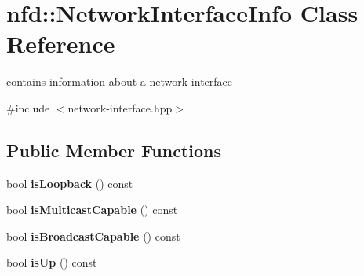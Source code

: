 \hypertarget{classnfd_1_1NetworkInterfaceInfo}{}\section{nfd\+:\+:Network\+Interface\+Info Class Reference}
\label{classnfd_1_1NetworkInterfaceInfo}


contains information about a network interface  




{\ttfamily \#include $<$network-\/interface.\+hpp$>$}

\subsection*{Public Member Functions}
\begin{DoxyCompactItemize}
\item 
bool {\bfseries is\+Loopback} () const\hypertarget{classnfd_1_1NetworkInterfaceInfo_a92528790a8c408245b7bc2b94d77c982}{}\label{classnfd_1_1NetworkInterfaceInfo_a92528790a8c408245b7bc2b94d77c982}

\item 
bool {\bfseries is\+Multicast\+Capable} () const\hypertarget{classnfd_1_1NetworkInterfaceInfo_adb6d6a655e9931b5e5f8f565a3ef85c6}{}\label{classnfd_1_1NetworkInterfaceInfo_adb6d6a655e9931b5e5f8f565a3ef85c6}

\item 
bool {\bfseries is\+Broadcast\+Capable} () const\hypertarget{classnfd_1_1NetworkInterfaceInfo_ac0bbebd2bafc846f324f25c1dc120def}{}\label{classnfd_1_1NetworkInterfaceInfo_ac0bbebd2bafc846f324f25c1dc120def}

\item 
bool {\bfseries is\+Up} () const\hypertarget{classnfd_1_1NetworkInterfaceInfo_a86051d15408383f1448e60860d8bea32}{}\label{classnfd_1_1NetworkInterfaceInfo_a86051d15408383f1448e60860d8bea32}

\end{DoxyCompactItemize}
